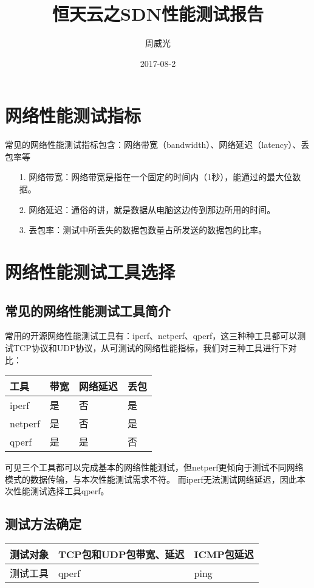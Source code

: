 \documentclass[a4paper,left=1.5cm,right=1.5cm,11pt]{article}
\title{恒天云之SDN性能测试报告}
\author{周威光}
\date{2017-08-2}
\begin{document}
\maketitle
\clearpage
\tableofcontents
\clearpage
\section{网络性能测试指标}
常见的网络性能测试指标包含：网络带宽（bandwidth）、网络延迟（latency）、丢包率等
\begin{itemize}
	\item[1.]网络带宽：网络带宽是指在一个固定的时间内（1秒），能通过的最大位数据。
	\item[2.]网络延迟：通俗的讲，就是数据从电脑这边传到那边所用的时间。
	\item[3.]丢包率：测试中所丢失的数据包数量占所发送的数据包的比率。
\end{itemize}

\section{网络性能测试工具选择}
\subsection{常见的网络性能测试工具简介}
常用的开源网络性能测试工具有：iperf、netperf、qperf，这三种种工具都可以测试TCP协议和UDP协议，从可测试的网络性能指标，我们对三种工具进行下对比：
\begin{center}
\begin{tabular}[c]{|l|l|l|l|}
\hline
工具 & 带宽 & 网络延迟 & 丢包 \\
\hline
iperf & 是 & 否 & 是 \\
\hline
netperf & 是 & 否 & 是 \\
\hline
qperf & 是 & 是 & 否 \\
\hline
\end{tabular}
\end{center}\par
可见三个工具都可以完成基本的网络性能测试，但netperf更倾向于测试不同网络模式的数据传输，与本次性能测试需求不符。
而iperf无法测试网络延迟，因此本次性能测试选择工具qperf。
\subsection{测试方法确定}
\begin{center}
\begin{tabular}[c]{|l|l|l|}
\hline
测试对象 & TCP包和UDP包带宽、延迟 & ICMP包延迟  \\
\hline
测试工具 & qperf & ping \\
\hline
\end{tabular}
\end{center}
\end{document}
